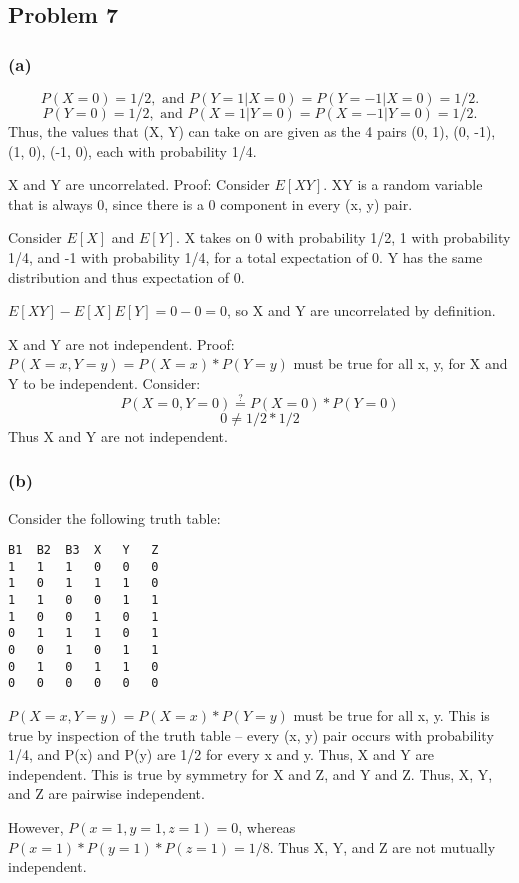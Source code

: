 \documentclass{article}
\begin{document}
    \subsection{Problem 7}\label{problem-7}

\subsubsection{(a)}\label{a}

\[P(X = 0) = 1/2, \text{ and } P(Y=1|X=0) = P(Y=-1|X=0) = 1/2.\]
\[P(Y = 0) = 1/2, \text{ and } P(X=1|Y=0) = P(X=-1|Y=0) = 1/2.\] Thus,
the values that (X, Y) can take on are given as the 4 pairs (0, 1), (0,
-1), (1, 0), (-1, 0), each with probability 1/4.

X and Y are uncorrelated. Proof: Consider \(E[XY]\). XY is a random
variable that is always 0, since there is a 0 component in every (x, y)
pair.

Consider \(E[X]\) and \(E[Y]\). X takes on 0 with probability 1/2, 1
with probability 1/4, and -1 with probability 1/4, for a total
expectation of 0. Y has the same distribution and thus expectation of 0.

\(E[XY] - E[X] E[Y] = 0 - 0 = 0\), so X and Y are uncorrelated by
definition.

X and Y are not independent. Proof: \(P(X=x, Y=y) = P(X=x) * P(Y=y)\)
must be true for all x, y, for X and Y to be independent. Consider:
\[P(X=0, Y=0) \stackrel{?}{=} P(X=0) * P(Y=0)\] \[0 \neq 1/2 * 1/2\]
Thus X and Y are not independent.

\subsubsection{(b)}\label{b}

Consider the following truth table:

\begin{verbatim}
B1  B2  B3  X   Y   Z
1   1   1   0   0   0
1   0   1   1   1   0
1   1   0   0   1   1
1   0   0   1   0   1
0   1   1   1   0   1
0   0   1   0   1   1
0   1   0   1   1   0
0   0   0   0   0   0
\end{verbatim}

\(P(X=x, Y=y) = P(X=x) * P(Y=y)\) must be true for all x, y. This is
true by inspection of the truth table -- every (x, y) pair occurs with
probability 1/4, and P(x) and P(y) are 1/2 for every x and y. Thus, X
and Y are independent. This is true by symmetry for X and Z, and Y and
Z. Thus, X, Y, and Z are pairwise independent.

However, \(P(x=1, y=1, z=1) = 0\), whereas
\(P(x=1) * P(y=1) * P(z=1) = 1/8\). Thus X, Y, and Z are not mutually
independent.


    
    
    
    
\end{document}
